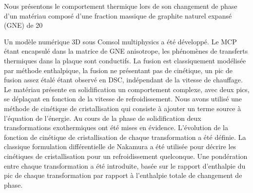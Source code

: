 {\normalsize
Nous présentons le comportement thermique lors de son changement de phase d'un matériau composé d'une fraction massique de graphite naturel expansé (GNE) de 20%



Un modèle numérique 3D sous Comsol multiphysics a été développé. Le MCP étant encapsulé dans la matrice de GNE anisotrope, les phénomènes de transferts thermiques dans la plaque sont conductifs. La fusion est classiquement modélisée par méthode enthalpique, la fusion ne présentant pas de cinétique, un pic de fusion assez étalé étant observé en DSC, indépendant de la vitesse de chauffage. Le matériau présente en solidification un comportement complexe, avec deux pics, se déplaçant en fonction de la vitesse de refroidissement. Nous avons utilisé une méthode de cinétique de cristallisation qui consiste à ajouter un terme source à l'équation de l'énergie. Au cours de la phase de solidification deux transformations exothermiques ont été mises en évidence. L'évolution de la fonction de cinétique de cristallisation de chaque transformation a été définie. La classique formulation différentielle de Nakamura a été utilisée pour décrire les cinétiques de cristallisation pour un refroidissement quelconque. Une pondération entre chaque transformation a été introduite, basée sur le rapport d'enthalpie du pic de chaque transformation par rapport à l'enthalpie totale de changement de phase. 



}
